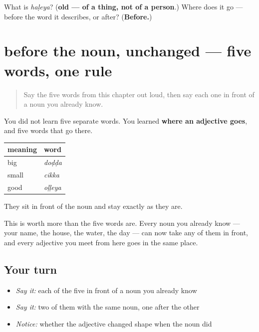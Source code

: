 \begin{tcolorbox}[breakable,colback=teal!4,colframe=teal!35!black,title={Before you move on}]
What is \emph{haḷeya}? (\textbf{old — of a thing, not of a person}.) Where does it go — before the word it describes, or after? (\textbf{Before.})
\end{tcolorbox}
\section[before the noun, unchanged]{before the noun, unchanged — five words, one rule}

\label{lesson:KA-C42-adjective-system}



\begin{quote}
Say the five words from this chapter out loud, then say each one in front of a noun you already know.
\end{quote}

\begin{grammarlens}[title={Grammar lens: where an adjective goes}]
You did not learn five separate words. You learned \textbf{where an adjective goes}, and five words that go there.

\noindent
\begin{tabularx}{\linewidth}{@{}>{\raggedright\arraybackslash}X>{\raggedright\arraybackslash}X@{}}
\toprule
\textbf{meaning} & \textbf{word} \\
\midrule
big & \textbf{\kn{ದೊಡ್ಡ}} \emph{doḍḍa} \\
small & \textbf{\kn{ಚಿಕ್ಕ}} \emph{cikka} \\
good & \textbf{\kn{ಒಳ್ಳೆಯ}} \emph{oḷḷeya} \\
\bottomrule
\end{tabularx}

They sit in front of the noun and stay exactly as they are.

This is worth more than the five words are. Every noun you already know — your name, the house, the water, the day — can now take any of them in front, and every adjective you meet from here goes in the same place.
\end{grammarlens}

\subsection*{Your turn}
\begin{itemize}
\raggedright
  \item \emph{Say it:} each of the five in front of a noun you already know
  \item \emph{Say it:} two of them with the same noun, one after the other
  \item \emph{Notice:} whether the adjective changed shape when the noun did
\end{itemize}


